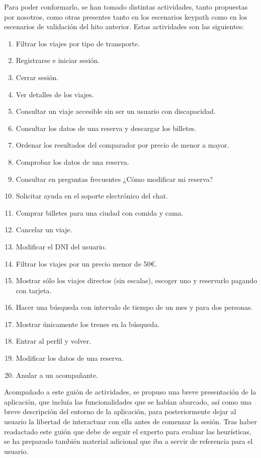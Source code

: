 Para poder conformarlo, se han tomado distintas actividades, tanto propuestas por nosotros, como otras presentes tanto en los escenarios keypath como en los escenarios de validación del hito anterior. Estas actividades
son las siguientes:
\begin{enumerate}
    \item Filtrar los viajes por tipo de transporte.
    \item Registrarse e iniciar sesión.
    \item Cerrar sesión.
    \item Ver detalles de los viajes.
    \item Consultar un viaje accesible sin ser un usuario con discapacidad.
    \item Consultar los datos de una reserva y descargar los billetes.
    \item Ordenar los resultados del comparador por precio de menor a mayor.
    \item Comprobar los datos de una reserva.
    \item Consultar en preguntas frecuentes ¿Cómo modificar mi reserva?
    \item Solicitar ayuda en el soporte electrónico del chat.
    \item Comprar billetes para una ciudad con comida y cama.
    \item Cancelar un viaje.
    \item Modificar el DNI del usuario.
    \item Filtrar los viajes por un precio menor de 50€.
    \item Mostrar sólo los viajes directos (sin escalas), escoger uno y reservarlo pagando con
    tarjeta.
    \item Hacer una búsqueda con intervalo de tiempo de un mes y para dos personas.
    \item Mostrar únicamente los trenes en la búsqueda.
    \item Entrar al perfil y volver.
    \item Modificar los datos de una reserva.
    \item Anular a un acompañante.
\end{enumerate}

Acompañado a este guión de actividades, se propuso una breve presentación de la aplicación, que incluía las funcionalidades que se habían abarcado, así como una breve descripción del entorno de
la aplicación, para posteriormente dejar al usuario la libertad de interactuar con ella antes de comenzar la sesión. Tras haber readactado este guión que debe de seguir el experto para evaluar las
heurísticas, se ha preparado también material adicional que iba a servir de referencia para el usuario. \\

